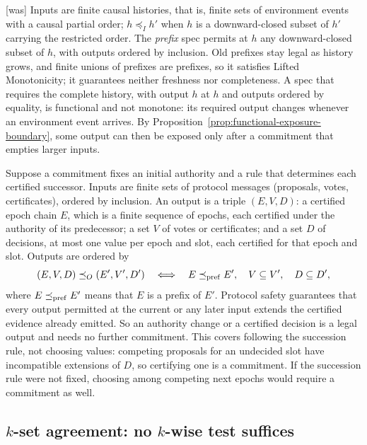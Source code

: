 \documentclass[sigconf]{cidr-2027}
\theoremstyle{remark}
\newcommand{\InputOrd}{\preceq_I}
\newcommand{\OutputOrd}{\preceq_O}
\newcommand{\commitment}{commitment\xspace}
\newcommand{\outrel}{extends\xspace}          %
\begin{document}
{\footnotesize\color{black!50}\noindent\textsf{[was]} Inputs are finite causal histories, that is, finite sets of environment events with a
causal partial order; $h\InputOrd h'$ when $h$ is a downward-closed subset of
$h'$ carrying the restricted order.  The \emph{prefix} spec permits
at $h$ any downward-closed subset of $h$, with outputs ordered by inclusion.
Old prefixes stay legal as history grows, and finite unions of prefixes are
prefixes, so it satisfies Lifted Monotonicity; it guarantees neither freshness
nor completeness.  A spec that requires the complete history, with
output $h$ at $h$ and outputs ordered by equality, is functional and not
monotone: its required output changes whenever an environment event arrives.  By
Proposition~\ref{prop:functional-exposure-boundary}, some output can then be
exposed only after a \commitment that empties larger inputs.\par}

\color{blue!70!black}Suppose a \commitment fixes an initial authority and a rule that determines
each certified successor.  Inputs are finite sets of protocol messages (proposals,
votes, certificates), ordered by inclusion.  An output is a triple $(E,V,D)$:
a certified epoch chain $E$, which is a finite sequence of epochs, each
certified under the authority of its predecessor; a set $V$ of votes or certificates; and a set
$D$ of decisions, at most one value per epoch and slot, each certified for
that epoch and slot.  Outputs are
ordered by
\begin{equation}
  (E,V,D)\OutputOrd(E',V',D')
  \quad\Longleftrightarrow\quad
  E\preceq_{\rm pref}E',\quad V\subseteq V',\quad D\subseteq D',
  \label{eq:authority-refinement}
\end{equation}
where $E\preceq_{\rm pref}E'$ means that $E$ is a prefix of $E'$.
Protocol safety guarantees that every output permitted at the current or any
later input \outrel the certified evidence already emitted.  So an authority
change or a certified decision is a legal output and needs no further
\commitment.  This covers following the succession rule, not choosing
values: competing proposals for an undecided slot have incompatible extensions
of $D$, so certifying one is a \commitment.  If the succession rule were not
fixed, choosing among competing next epochs would require a \commitment as
well.\color{black}

\subsection{$k$-set agreement: no $k$-wise test suffices}
\end{document}
